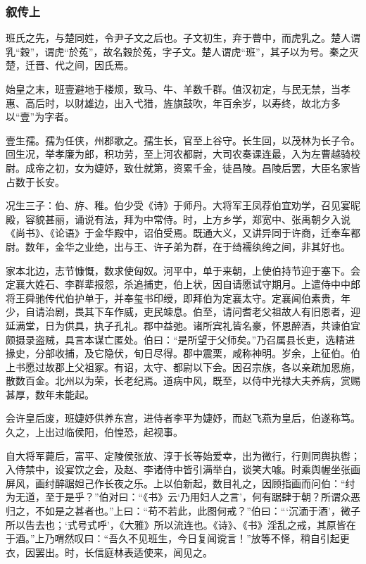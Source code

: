 \documentclass[]{article}
\begin{document}
\hypertarget{header-n6994}{%
\subsubsection{叙传上}\label{header-n6994}}

班氏之先，与楚同姓，令尹子文之后也。子文初生，弃于瞢中，而虎乳之。楚人谓乳``穀''，谓虎``於菟''，故名穀於菟，字子文。楚人谓虎``班''，其子以为号。秦之灭楚，迁晋、代之间，因氏焉。

始皇之末，班壹避地于楼烦，致马、牛、羊数千群。值汉初定，与民无禁，当孝惠、高后时，以财雄边，出入弋猎，旌旗鼓吹，年百余岁，以寿终，故北方多以``壹''为字者。

壹生孺。孺为任侠，州郡歌之。孺生长，官至上谷守。长生回，以茂林为长子令。回生况，举孝廉为郎，积功劳，至上河农都尉，大司农奏课连最，入为左曹越骑校尉。成帝之初，女为婕妤，致仕就第，资累千金，徒昌陵。昌陵后罢，大臣名家皆占数于长安。

况生三子：伯、斿、稚。伯少受《诗》于师丹。大将军王凤荐伯宜劝学，召见宴昵殿，容貌甚丽，诵说有法，拜为中常侍。时，上方乡学，郑宽中、张禹朝夕入说《尚书》、《论语》于金华殿中，诏伯受焉。既通大义，又讲异同于许商，迁奉车都尉。数年，金华之业绝，出与王、许子弟为群，在于绮襦纨绔之间，非其好也。

家本北边，志节慷慨，数求使匈奴。河平中，单于来朝，上使伯持节迎于塞下。会定襄大姓石、李群辈报怨，杀追捕吏，伯上状，因自请愿试守期月。上遣侍中中郎将王舜驰传代伯护单于，并奉玺书印绶，即拜伯为定襄太守。定襄闻伯素贵，年少，自请治剧，畏其下车作威，吏民竦息。伯至，请问耆老父祖故人有旧恩者，迎延满堂，日为供具，执子孔礼。郡中益弛。诸所宾礼皆名豪，怀恩醉酒，共谏伯宜颇摄录盗贼，具言本谋亡匿处。伯曰：``是所望于父师矣。''乃召属县长吏，选精进掾史，分部收捕，及它隐伏，旬日尽得。郡中震栗，咸称神明。岁余，上征伯。伯上书愿过故郡上父祖冢。有诏，太守、都尉以下会。因召宗族，各以亲疏加恩施，散数百金。北州以为荣，长老纪焉。道病中风，既至，以侍中光禄大夫养病，赏赐甚厚，数年未能起。

会许皇后废，班婕妤供养东宫，进侍者李平为婕妤，而赵飞燕为皇后，伯遂称笃。久之，上出过临侯阳，伯惶恐，起视事。

自大将军薨后，富平、定陵侯张放、淳于长等始爱幸，出为微行，行则同舆执辔；入侍禁中，设宴饮之会，及赵、李诸侍中皆引满举白，谈笑大噱。时乘舆幄坐张画屏风，画纣醉踞妲己作长夜之乐。上以伯新起，数目礼之，因顾指画而问伯：``纣为无道，至于是乎？''伯对曰：``《书》云`乃用妇人之言'，何有踞肆于朝？所谓众恶归之，不如是之甚者也。''上曰：``苟不若此，此图何戒？''伯曰：```沉湎于酒'，微子所以告去也；`式号式呼'，《大雅》所以流连也。《诗》、《书》淫乱之戒，其原皆在于酒。''上乃喟然叹曰：``吾久不见班生，今日复闻谠言！''放等不怿，稍自引起更衣，因罢出。时，长信庭林表适使来，闻见之。
\end{document}
